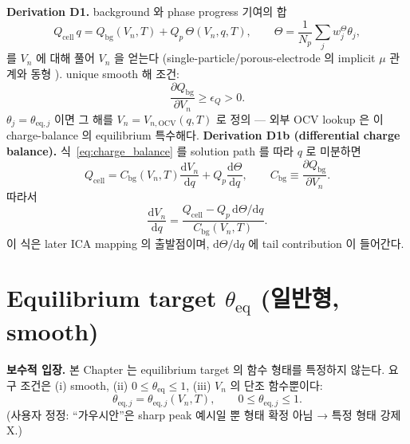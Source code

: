 \documentclass[11pt,a4paper]{article}
\newcommand{\dd}{\mathrm{d}}
\newcommand{\eq}{\mathrm{eq}}
\newcommand{\bg}{\mathrm{bg}}
\newcommand{\cell}{\mathrm{cell}}
\begin{document}
\textbf{Derivation D1.} background 와 phase progress 기여의 합
\begin{equation}
Q_\cell\,q = Q_\bg(V_n,T) + Q_p\,\Theta(V_n,q,T),\qquad \Theta=\frac1{N_p}\sum_j w^\Theta_j\theta_j,
\label{eq:charge_balance}
\end{equation}
를 $V_n$ 에 대해 풀어 $V_n$ 을 얻는다 (single-particle/porous-electrode 의 implicit $\mu$
관계와 동형 \cite{doyle1993,newman}). unique smooth 해 조건:
\begin{equation}
\frac{\partial Q_\bg}{\partial V_n}\ge\epsilon_Q>0.
\label{eq:monotone}
\end{equation}
$\theta_j=\theta_{\eq,j}$ 이면 그 해를 $V_n=V_{n,\mathrm{OCV}}(q,T)$ 로 정의 — 외부 OCV
lookup 은 이 charge-balance 의 equilibrium 특수해다.
\textbf{Derivation D1b (differential charge balance).} 식~\eqref{eq:charge_balance} 를
solution path 를 따라 $q$ 로 미분하면
\begin{equation}
Q_\cell
=
C_\bg(V_n,T)\frac{\dd V_n}{\dd q}
+Q_p\frac{\dd\Theta}{\dd q},
\qquad
C_\bg\equiv \frac{\partial Q_\bg}{\partial V_n}.
\label{eq:charge_balance_differential}
\end{equation}
따라서
\begin{equation}
\frac{\dd V_n}{\dd q}
=
\frac{Q_\cell-Q_p\,\dd\Theta/\dd q}{C_\bg(V_n,T)}.
\label{eq:dvdq_charge}
\end{equation}
이 식은 later ICA mapping 의 출발점이며, $\dd\Theta/\dd q$ 에 tail contribution 이 들어간다.

\section{Equilibrium target $\theta_\eq$ (일반형, smooth)}\label{sec:equilibrium}
\textbf{보수적 입장.} 본 Chapter 는 equilibrium target 의 함수 형태를 특정하지 않는다.
요구 조건은 (i) smooth, (ii) $0\le\theta_\eq\le1$, (iii) $V_n$ 의 단조 함수뿐이다:
\begin{equation}
\theta_{\eq,j}=\theta_{\eq,j}(V_n,T),\qquad 0\le\theta_{\eq,j}\le1.
\label{eq:thetae}
\end{equation}
(사용자 정정: ``가우시안''은 sharp peak 예시일 뿐 형태 확정 아님 → 특정 형태 강제 X.)
\end{document}
